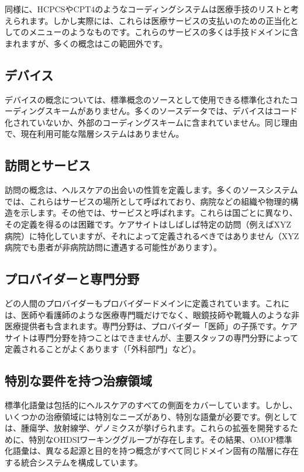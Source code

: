 \documentclass[
  11pt]{book}
\theoremstyle{definition}
\theoremstyle{definition}
\theoremstyle{definition}
\theoremstyle{definition}
\theoremstyle{remark}
\begin{document}
同様に、HCPCSやCPT4のようなコーディングシステムは医療手技のリストと考えられます。しかし実際には、これらは医療サービスの支払いのための正当化としてのメニューのようなものです。これらのサービスの多くは手技ドメインに含まれますが、多くの概念はこの範囲外です。

\subsection{デバイス}\label{ux30c7ux30d0ux30a4ux30b9}

デバイスの概念については、標準概念のソースとして使用できる標準化されたコーディングスキームがありません。多くのソースデータでは、デバイスはコード化されていないか、外部のコーディングスキームに含まれていません。同じ理由で、現在利用可能な階層システムはありません。

\subsection{訪問とサービス}\label{ux8a2aux554fux3068ux30b5ux30fcux30d3ux30b9}

訪問の概念は、ヘルスケアの出会いの性質を定義します。多くのソースシステムでは、これらはサービスの場所として呼ばれており、病院などの組織や物理的構造を示します。その他では、サービスと呼ばれます。これらは国ごとに異なり、その定義を得るのは困難です。ケアサイトはしばしば特定の訪問（例えばXYZ病院）に特化していますが、それによって定義されるべきではありません（XYZ病院でも患者が非病院訪問に遭遇する可能性があります）。

\subsection{プロバイダーと専門分野}\label{ux30d7ux30edux30d0ux30a4ux30c0ux30fcux3068ux5c02ux9580ux5206ux91ce}

どの人間のプロバイダーもプロバイダードメインに定義されています。これには、医師や看護師のような医療専門職だけでなく、眼鏡技師や靴職人のような非医療提供者も含まれます。専門分野は、プロバイダー「医師」の子孫です。ケアサイトは専門分野を持つことはできませんが、主要スタッフの専門分野によって定義されることがよくあります（「外科部門」など）。

\subsection{特別な要件を持つ治療領域}\label{ux7279ux5225ux306aux8981ux4ef6ux3092ux6301ux3064ux6cbbux7642ux9818ux57df}

標準化語彙は包括的にヘルスケアのすべての側面をカバーしています。しかし、いくつかの治療領域には特別なニーズがあり、特別な語彙が必要です。例としては、腫瘍学、放射線学、ゲノミクスが挙げられます。これらの拡張を開発するために、特別なOHDSIワーキンググループが存在します。その結果、OMOP標準化語彙は、異なる起源と目的を持つ概念がすべて同じドメイン固有の階層に存在する統合システムを構成しています。
\end{document}
